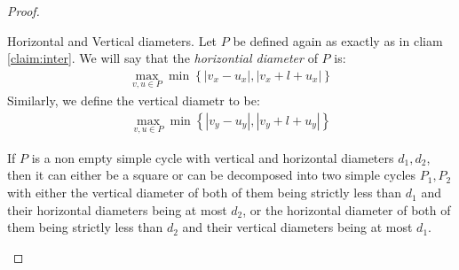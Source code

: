 \begin{proof}
\begin{figure}[h]
\end{figure}

  \begin{definition}
    Horizontal and Vertical diameters. Let $P$ be defined again as exactly as in cliam \cref{claim:inter}. We will say that the \textit{horizontial diameter} of $P$ is: 
    \begin{equation*}
      \begin{split}
        \max_{v,u\in P} \min{ \left\{  | v_{x} -u_{x}|, |v_{x} + l + u_{x}| \right\} }  
      \end{split}
    \end{equation*}
    Similarly, we define the vertical diametr to be: 
    \begin{equation*}
      \begin{split}
        \max_{v,u\in P} \min{ \left\{  | v_{y} -u_{y}|, |v_{y} + l + u_{y}| \right\} }  
      \end{split}
    \end{equation*}
  \end{definition}

  \begin{claim} 
If $P$ is a non empty simple cycle with vertical and horizontal diameters $d_{1}, d_{2}$, then it can either be a square or can be decomposed into two simple cycles $P_{1},P_{2}$ with either the vertical diameter of both of them being strictly less than $d_{1}$ and their horizontal diameters being at most $d_{2}$, or the horizontal diameter of both of them being strictly less than $d_{2}$ and their vertical diameters being at most $d_{1}$.
  \end{claim}


\end{proof}
